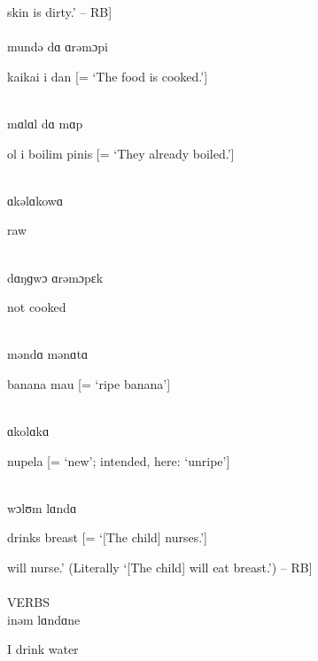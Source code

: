 \noindent [‘[My] skin is dirty.’ -- RB]\\

\\

\noindent mundə dɑ ɑrəmɔpi

\noindent kaikai i dan [= ‘The food is cooked.’]

\\

\noindent mɑlɑl dɑ mɑp

\noindent ol i boilim pinis [= ‘They already boiled.’]

\\

\noindent ɑkəlɑkowɑ

\noindent raw

\noindent [‘raw’ -- RB]\\

\noindent dɑŋɡwɔ ɑrəmɔpɛk

\noindent not cooked

\\

\noindent məndɑ mənɑtɑ

\noindent banana mau [= ‘ripe banana’]

\\

\noindent ɑkolɑkɑ

\noindent nupela [= ‘new’; intended, here: ‘unripe’]

\noindent [‘new’ -- RB]\\

\noindent wɔlʊm lɑndɑ

\noindent drinks breast [= ‘[The child] nurses.’]

\noindent [‘[The child] will nurse.’ (Literally ‘[The child] will eat breast.’) -- RB]\\

\\

\noindent VERBS\\

\noindent inəm lɑndɑne


\noindent I drink water

